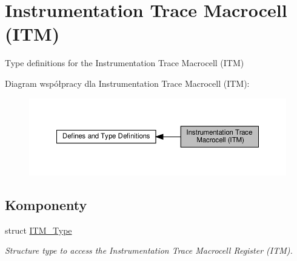 \hypertarget{group___c_m_s_i_s___i_t_m}{}\section{Instrumentation Trace Macrocell (I\+TM)}
\label{group___c_m_s_i_s___i_t_m}


Type definitions for the Instrumentation Trace Macrocell (I\+TM)  


Diagram współpracy dla Instrumentation Trace Macrocell (I\+TM)\+:\nopagebreak
\begin{figure}[H]
\begin{center}
\leavevmode
\includegraphics[width=350pt]{group___c_m_s_i_s___i_t_m}
\end{center}
\end{figure}
\subsection*{Komponenty}
\begin{DoxyCompactItemize}
\item 
struct \hyperlink{struct_i_t_m___type}{I\+T\+M\+\_\+\+Type}
\begin{DoxyCompactList}\small\item\em Structure type to access the Instrumentation Trace Macrocell Register (I\+TM). \end{DoxyCompactList}\end{DoxyCompactItemize}
